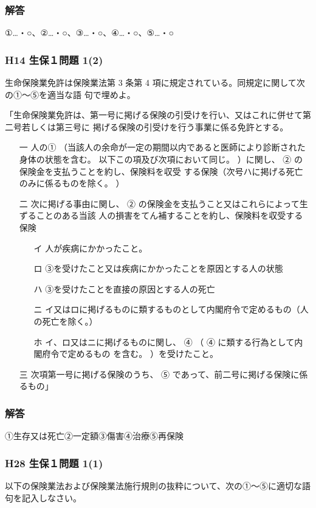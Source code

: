 \documentclass[report,gutter=10mm,fore-edge=10mm,uplatex,dvipdfmx]{jlreq}
\begin{document}
\subsubsection{解答}
①…・○、②…・○、③…・○、④…・○、⑤…・○

\subsubsection{H14 生保１問題 1(2)}
生命保険業免許は保険業法第 3 条第 4 項に規定されている。同規定に関して次の①～⑤を適当な語
句で埋めよ。

「生命保険業免許は、第一号に掲げる保険の引受けを行い、又はこれに併せて第二号若しくは第三号に
掲げる保険の引受けを行う事業に係る免許とする。

\begin{itemize}
 \item [一]  人の①
（当該人の余命が一定の期間以内であると医師により診断された身体の状態を含む。
以下この項及び次項において同じ。
）に関し、 ②
の保険金を支払うことを約し、保険料を収受
する保険（次号ハに掲げる死亡のみに係るものを除く。
）
 \item [二] 次に掲げる事由に関し、 ②
の保険金を支払うこと又はこれらによって生ずることのある当該
人の損害をてん補することを約し、保険料を収受する保険
\begin{itemize}
 \item [イ]
 人が疾病にかかったこと。
 \item [ロ]
③を受けたこと又は疾病にかかったことを原因とする人の状態
 \item [ハ]
③を受けたことを直接の原因とする人の死亡
 \item [ニ]
 イ又はロに掲げるものに類するものとして内閣府令で定めるもの（人の死亡を除く。）
 \item [ホ]
 イ、ロ又はニに掲げるものに関し、 ④ （
④
に類する行為として内閣府令で定めるもの
を含む。
）を受けたこと。
\end{itemize}
 \item [三]
 次項第一号に掲げる保険のうち、
⑤
であって、前二号に掲げる保険に係るもの」
\end{itemize}

\subsubsection{解答}
①生存又は死亡②一定額③傷害④治療⑤再保険

\subsubsection{H28 生保１問題 1(1)}
以下の保険業法および保険業法施行規則の抜粋について、次の①～⑤に適切な語句を記入しなさい。
\end{document}
